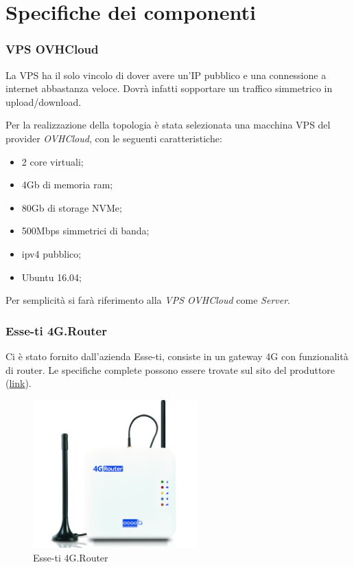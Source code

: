 \section{Specifiche dei componenti}

\subsubsection{VPS OVHCloud}
\label{subsec:vps-ovhcloud}

La VPS ha il solo vincolo di dover avere un'IP pubblico e una connessione a internet abbastanza veloce. Dovrà infatti sopportare un traffico simmetrico in upload/download.

Per la realizzazione della topologia è stata selezionata una macchina VPS del provider \textit{OVHCloud}, con le seguenti caratteristiche:


\begin{itemize}[nosep]
	\item 2 core virtuali;
	\item 4Gb di memoria ram;
	\item 80Gb di storage NVMe;
	\item 500Mbps simmetrici di banda;
	\item ipv4 pubblico;
	\item Ubuntu 16.04;
\end{itemize}

Per semplicità si farà riferimento alla \textit{VPS OVHCloud} come \textit{Server}.

\subsubsection{Esse-ti 4G.Router}

Ci è stato fornito dall'azienda Esse-ti, consiste in un gateway 4G con funzionalità di router. Le specifiche complete possono essere trovate sul sito del produttore (\href{https://www.esse-ti.it/4g-router}{link}).


\begin{figure}[ht]
	\centering
	\includegraphics[width=240px]{immagini/4grouter.jpg}
	\caption{Esse-ti 4G.Router}
	\label{fig:esse-ti-router-4g}
\end{figure}

